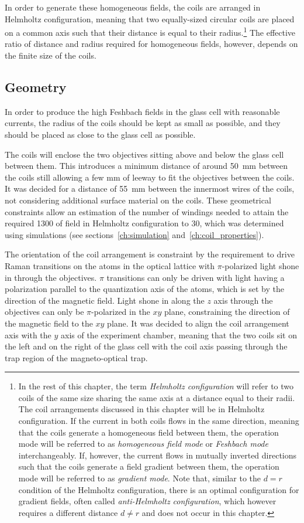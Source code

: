 In order to generate these homogeneous fields, the coils are arranged in Helmholtz configuration, meaning that two equally-sized circular coils are placed on a common axis such that their distance is equal to their radius.\footnote{In the rest of this chapter, the term \textit{Helmholtz configuration} will refer to two coils of the same size sharing the same axis at a distance equal to their radii. The coil arrangements discussed in this chapter will be in Helmholtz configuration. If the current in both coils flows in the same direction, meaning that the coils generate a homogeneous field between them, the operation mode will be referred to as \textit{homogeneous field mode} or \textit{Feshbach mode} interchangeably. If, however, the current flows in mutually inverted directions such that the coils generate a field gradient between them, the operation mode will be referred to as \textit{gradient mode}. Note that, similar to the $d = r$ condition of the Helmholtz configuration, there is an optimal configuration for gradient fields, often called \textit{anti-Helmholtz configuration}, which however requires a different distance $d \neq r$ and does not occur in this chapter.} The effective ratio of distance and radius required for homogeneous fields, however, depends on the finite size of the coils.

\subsection*{Geometry}
In order to produce the high Feshbach fields in the glass cell with reasonable currents, the radius of the coils should be kept as small as possible, and they should be placed as close to the glass cell as possible.

The coils will enclose the two objectives sitting above and below the glass cell between them. This introduces a minimum distance of around \SI{50}{\milli\meter} between the coils still allowing a few \si[]{\milli\meter} of leeway to fit the objectives between the coils. It was decided for a distance of \SI{55}{\milli\meter} between the innermost wires of the coils, not considering additional surface material on the coils. These geometrical constraints allow an estimation of the number of windings needed to attain the required \SI{1300}{\gauss} of field in Helmholtz configuration to 30, which was determined using simulations (see sections~\ref{ch:simulation} and~\ref{ch:coil_properties}).

The orientation of the coil arrangement is constraint by the requirement to drive Raman transitions on the atoms in the optical lattice with $\pi$-polarized light shone in through the objectives. $\pi$ transitions can only be driven with light having a polarization parallel to the quantization axis of the atoms, which is set by the direction of the magnetic field. Light shone in along the $z$ axis through the objectives can only be $\pi$-polarized in the $xy$ plane, constraining the direction of the magnetic field to the $xy$ plane. It was decided to align the coil arrangement axis with the $y$ axis of the experiment chamber, meaning that the two coils sit on the left and on the right of the glass cell with the coil axis passing through the trap region of the magneto-optical trap.


